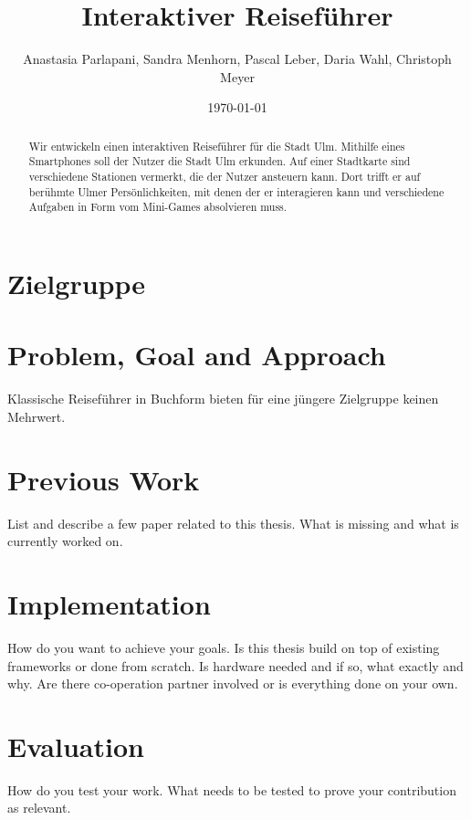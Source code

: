 \documentclass[]{hci-proposal}
\title{Interaktiver Reiseführer}
\author{Anastasia Parlapani, Sandra Menhorn, Pascal Leber, Daria Wahl, Christoph Meyer}
\date{\today}
\begin{document}

\maketitle

\begin{abstract}
  Wir entwickeln einen interaktiven Reiseführer für die Stadt Ulm. Mithilfe eines Smartphones soll
  der Nutzer die Stadt Ulm erkunden. Auf einer Stadtkarte sind verschiedene Stationen vermerkt, die
  der Nutzer ansteuern kann. Dort trifft er auf berühmte Ulmer Persönlichkeiten, mit denen der er
  interagieren kann und verschiedene Aufgaben in Form vom Mini-Games absolvieren muss. 
  
  
  
\end{abstract}


\section{Zielgruppe}

\section{Problem, Goal and Approach}
Klassische Reiseführer in Buchform bieten für eine jüngere Zielgruppe keinen Mehrwert.


\section{Previous Work}
List and describe a few paper related to this thesis.
What is missing and what is currently worked on.

\section{Implementation}
How do you want to achieve your goals.
Is this thesis build on top of existing frameworks or done from scratch.
Is hardware needed and if so, what exactly and why.
Are there co-operation partner involved or is everything done on your own.

\section{Evaluation}
How do you test your work.
What needs to be tested to prove your contribution as relevant.
\end{document}
